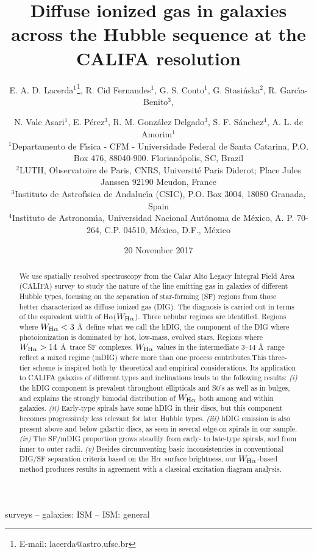 \documentclass[a4paper, fleqn, usenatbib, useAMS]{mnras}
\title[DIG across the Hubble sequence]{Diffuse ionized gas in galaxies across the Hubble sequence at the CALIFA resolution}
\author[Lacerda et.\ al.] {E. A. D. Lacerda$^1$\thanks{E-mail: lacerda@astro.ufsc.br},
 R. Cid Fernandes$^1$,
 G. S. Couto$^1$,
 G. Stasi\'nska$^2$,
 R. Garc\'{\i}a-Benito$^3$, \and
 N. Vale Asari$^1$,
 E. P\'erez$^3$,
 R. M. Gonz\'alez Delgado$^3$,
S. F. S\'anchez$^4$,
A. L. de Amorim$^1$ \\
 $^1$Departamento de F\'{\i}sica - CFM - Universidade Federal de Santa Catarina, P.O. Box 476, 88040-900.
 Florian\'opolis, SC, Brazil\\
 $^2$LUTH, Observatoire de Paris, CNRS, Universit\'e Paris Diderot; Place Jules Janssen 92190 Meudon, France\\
 $^3$Instituto de Astrof\'{\i}sica de Andaluc\'{\i}a (CSIC), P.O. Box 3004, 18080 Granada, Spain\\
 $^4$Instituto de Astronom\'{\i}a, Universidad Nacional Aut\'onoma de M\'exico, A. P. 70-264, C.P. 04510, M\'exico, D.F., M\'exico
}
\date{20 November 2017}
\newcommand{\Ha}{\ifmmode {\rm H}\alpha \else H$\alpha$\fi\xspace}
\begin{document}
\label{firstpage}
\pagerange{\pageref{firstpage}--\pageref{lastpage}}
\maketitle


\begin{abstract}
We use spatially resolved spectroscopy from the Calar Alto Legacy Integral Field Area (CALIFA) survey to study the nature of the line emitting gas in galaxies of different Hubble types, focusing on the separation of star-forming (SF) regions from those better characterized as diffuse ionized gas (DIG). The diagnosis is carried out in terms of the equivalent width of \Ha ($W_{\Ha}$). Three nebular regimes are identified. Regions where $W_{\Ha} < 3$ \AA\  define what we call the hDIG, the component of the DIG where photoionization is dominated by hot, low-mass, evolved stars. Regions where $W_{\Ha} > 14$ \AA\ trace SF complexes. $W_{\Ha}$ values in the intermediate 3--14 \AA\ range reflect a mixed regime (mDIG) where more than one process contributes.This three-tier scheme is inspired both by theoretical and empirical considerations. Its application to CALIFA galaxies  of different types and inclinations leads to the following results: \textit{(i)} the hDIG component is prevalent throughout ellipticals and S0's as well as in bulges, and explains the strongly bimodal distribution of $W_{\Ha}$ both among and within galaxies. \textit{(ii)} Early-type spirals have some hDIG in their discs, but this component becomes progressively less relevant for  later Hubble types. \textit{(iii)}  hDIG emission is also present above and below galactic discs, as  seen in several edge-on spirals in our sample. \textit{(iv)} The SF/mDIG proportion grows steadily from early- to late-type spirals, and from inner to outer radii. \textit{(v)} Besides circumventing basic inconsistencies in conventional DIG/SF separation criteria based on the \Ha\ surface brightness, our $W_{\Ha}$-based method produces results in agreement with a classical excitation diagram analysis.

\end{abstract}

\begin{keywords}
  surveys -- galaxies: ISM -- ISM: general
\end{keywords}

\label{firstpage}
\end{document}
